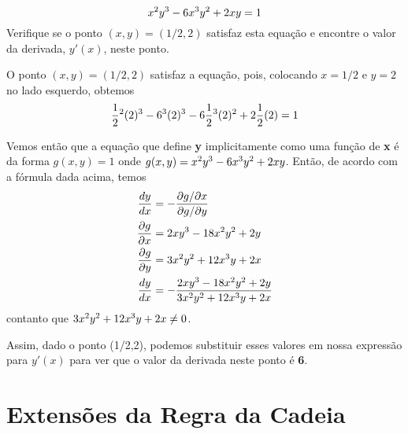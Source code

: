 \documentclass[a4paper]{article}
\begin{document}
\begin{equation}
    x\textsuperscript{2}y\textsuperscript{3} - 6x\textsuperscript{3}y\textsuperscript{2} + 2xy = 1
\end{equation}
Verifique se o ponto $(x,y) = (1/2,2)$ satisfaz esta equação e encontre o valor da derivada, $y'(x)$, neste ponto.
\par O ponto $(x,y) = (1/2,2)$ satisfaz a equação, pois, colocando $x = 1/2$ e $y = 2$ no lado esquerdo, obtemos
\begin{equation}
    \frac{1}{2}\textsuperscript{2}(2)\textsuperscript{3} - 6\textsuperscript{3}(2)\textsuperscript{3} - 6\frac{1}{2}\textsuperscript{3}(2)\textsuperscript{2} + 2\frac{1}{2}(2) = 1
\end{equation}
\par Vemos então que a equação que define \textbf{y} implicitamente como uma função de \textbf{x} é da forma $g(x,y) = 1$ onde $g(x,y) = x\textsuperscript{2}y\textsuperscript{3} - 6x\textsuperscript{3}y\textsuperscript{2}+2xy$. Então, de acordo com a fórmula dada acima, temos
\begin{equation}
    \begin{split}
        \frac{dy}{dx} & = - \frac{\partial g/\partial x}{\partial g/\partial y} \\
        \frac{\partial g}{\partial x}& = 2xy\textsuperscript{3} - 18x\textsuperscript{2}y\textsuperscript{2} + 2y \\
        \frac{\partial g}{\partial y}& = 3x\textsuperscript{2}y\textsuperscript{2} + 12x\textsuperscript{3}y + 2x \\
        \frac{dy}{dx} & = - \frac{2xy\textsuperscript{3} - 18x\textsuperscript{2}y\textsuperscript{2} + 2y}{3x\textsuperscript{2}y\textsuperscript{2} + 12x\textsuperscript{3}y + 2x}
    \end{split}
\end{equation}
contanto que $3x\textsuperscript{2}y\textsuperscript{2} + 12x\textsuperscript{3}y + 2x \neq 0$.
\par Assim, dado o ponto (1/2,2), podemos substituir esses valores em nossa expressão para $y'(x)$ para ver que o valor da derivada neste ponto é \textbf{6}.
\section{Extensões da Regra da Cadeia}
\end{document}
